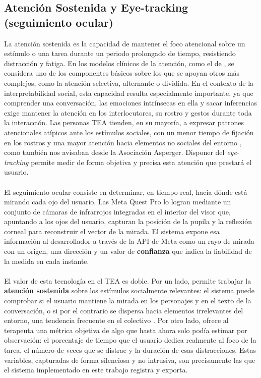 \documentclass[12pt,twoside,titlepage]{report}
\begin{document}
\subsection{Atención Sostenida y Eye-tracking (seguimiento ocular)}

La atención sostenida es la capacidad de mantener el foco atencional sobre un estímulo o una tarea durante un periodo prolongado de tiempo, resistiendo distracción y fatiga.
En los modelos clínicos de la atención, como el de \parencite{sohlberg1987effectiveness}, se considera uno de los componentes básicos sobre los que se apoyan otros más complejos, como la atención selectiva, alternante o dividida.
En el contexto de la interpretabilidad social, esta capacidad resulta especialmente importante, ya que comprender una conversación, las emociones intrínsecas en ella y sacar inferencias exige mantener la atención en los interlocutores, su rostro y gestos durante toda la interacción.
Las personas TEA tienden, en su mayoría, a expresar patrones atencionales atípicos ante los estímulos sociales, con un menor tiempo de fijación en los rostros y una mayor atención hacia elementos no sociales del entorno \parencite{klin2002,chitategmark2016}, como también nos avisaban desde la Asociación Asperger.
Disponer del \textit{eye-tracking} permite medir de forma objetiva y precisa esta atención que prestará el usuario.
\\\\
El seguimiento ocular consiste en determinar, en tiempo real, hacia dónde está mirando cada ojo del usuario.
Las Meta Quest Pro lo logran mediante un conjunto de cámaras de infrarrojos integradas en el interior del visor que, apuntando a los ojos del usuario, capturan la posición de la pupila y la reflexión corneal para reconstruir el vector de la mirada.
El sistema expone esa información al desarrollador a través de la API de Meta como un rayo de mirada con un origen, una dirección y un valor de \textbf{confianza} que indica la fiabilidad de la medida en cada instante.\\
\\
El valor de esta tecnología en el TEA es doble.
Por un lado, permite trabajar la \textbf{atención sostenida} sobre los estímulos socialmente relevantes: el sistema puede comprobar si el usuario mantiene la mirada en los personajes y en el texto de la conversación, o si por el contrario se dispersa hacia elementos irrelevantes del entorno, una tendencia frecuente en el colectivo \parencite{guillon2014}.
Por otro lado, ofrece al terapeuta una métrica objetiva de algo que hasta ahora solo podía estimar por observación: el porcentaje de tiempo que el usuario dedica realmente al foco de la tarea, el número de veces que se distrae y la duración de esas distracciones.
Estas variables, capturadas de forma silenciosa y no intrusiva, son precisamente las que el sistema implementado en este trabajo registra y exporta.
\end{document}
